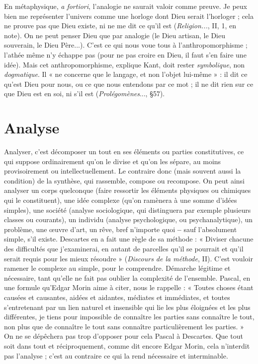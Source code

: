 En métaphysique, {\it a fortiori}, l'analogie ne saurait valoir comme preuve. Je
peux bien me représenter l’univers comme une horloge dont Dieu serait
l’horloger ; cela ne prouve pas que Dieu existe, ni ne me dit ce qu’il est ({\it Religion...},
II, 1, en note). On ne peut penser Dieu que par analogie (le Dieu
artisan, le Dieu souverain, le Dieu Père...). C’est ce qui nous voue tous à
l’anthropomorphisme ; l’athée même n’y échappe pas (pour ne pas croire en
Dieu, il faut s’en faire une idée). Mais cet anthropomorphisme, explique Kant,
doit rester {\it symbolique}, non {\it dogmatique}. Il « ne concerne que le langage, et non
l'objet lui-même » : il dit ce qu’est Dieu pour nous, ou ce que nous entendons
par ce mot ; il ne dit rien sur ce que Dieu est en soi, ni s’il est ({\it Prolégomènes}...,
\S 57).

\section{Analyse}
Analyser, c’est décomposer un tout en ses éléments ou parties
constitutives, ce qui suppose ordinairement qu’on le divise et
qu'on les sépare, au moins provisoirement ou intellectuellement. Le contraire
donc (mais souvent aussi la condition) de la synthèse, qui rassemble, compose
ou recompose. On peut ainsi analyser un corps quelconque (faire ressortir les
éléments physiques ou chimiques qui le constituent), une idée complexe
(qu'on ramènera à une somme d’idées simples), une société (analyse sociologique,
qui distinguera par exemple plusieurs classes ou courants), un individu
(analyse psychologique, ou psychanalytique), un problème, une œuvre d’art,
un rêve, bref n'importe quoi {\bf --} sauf l’absolument simple, s’il existe. Descartes
en a fait une règle de sa méthode : « Diviser chacune des difficultés que j’examinerai,
en autant de parcelles qu’il se pourrait et qu’il serait requis pour les
mieux résoudre » ({\it Discours de la méthode}, II). C’est vouloir ramener le complexe
au simple, pour le comprendre. Démarche légitime et nécessaire, tant
qu'elle ne fait pas oublier la complexité de l’ensemble. Pascal, en une formule
qu'Edgar Morin aime à citer, nous le rappelle : « Toutes choses étant causées et
causantes, aidées et aidantes, médiates et immédiates, et toutes s’entretenant
par un lien naturel et insensible qui lie les plus éloignées et les plus différentes,
je tiens pour impossible de connaître les parties sans connaître le tout, non plus
que de connaître le tout sans connaître particulièrement les parties. » On ne se
dépêchera pas trop d’opposer pour cela Pascal à Descartes. Que tout soit dans
tout et réciproquement, comme dit encore Edgar Morin, cela n’interdit pas
l'analyse ; c’est au contraire ce qui la rend nécessaire et interminable.

